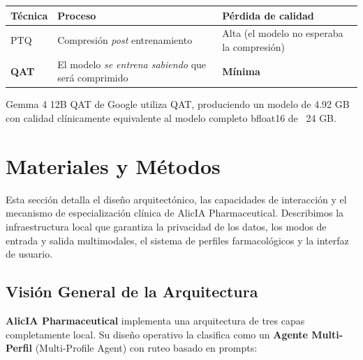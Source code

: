 \documentclass[12pt,a4paper]{article}
\begin{document}
\begin{infobox}
  \begin{tabularx}{\linewidth}{lXX}
    \toprule
    \textbf{Técnica} & \textbf{Proceso} & \textbf{Pérdida de calidad} \\
    \midrule
    PTQ & Compresión \textit{post} entrenamiento & Alta (el modelo no esperaba la compresión) \\
    \textbf{QAT} & El modelo \textit{se entrena sabiendo} que será comprimido & \textbf{Mínima} \\
    \bottomrule
  \end{tabularx}
  \medskip
  Gemma 4 12B QAT de Google utiliza QAT, produciendo un modelo de 4.92 GB con calidad
  clínicamente equivalente al modelo completo bfloat16 de ~24 GB.
\end{infobox}

\newpage

\section{Materiales y Métodos}

Esta sección detalla el diseño arquitectónico, las capacidades de interacción y el mecanismo de especialización clínica de AlicIA Pharmaceutical. Describimos la infraestructura local que garantiza la privacidad de los datos, los modos de entrada y salida multimodales, el sistema de perfiles farmacológicos y la interfaz de usuario.

\subsection{Visión General de la Arquitectura}

\textbf{AlicIA Pharmaceutical} implementa una arquitectura de tres capas completamente local. Su diseño operativo la clasifica como un \textbf{Agente Multi-Perfil} (Multi-Profile Agent) con ruteo basado en prompts:
\end{document}
